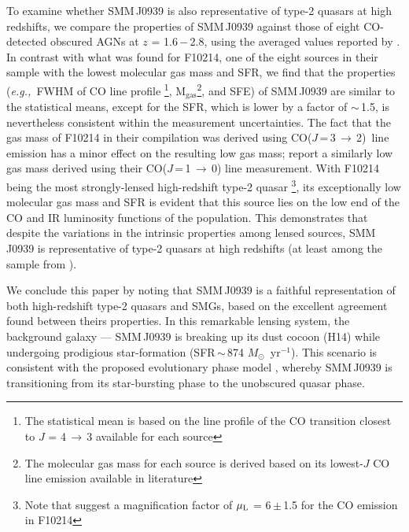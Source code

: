 \documentclass[iop]{emulateapj}
\newcommand{\Msun}{\mbox{$M_{\odot}$}}
\newcommand{\rarr}{$\rightarrow$}
\newcommand{\CO}{\mbox{CO($J$\,=\,3\,$\rightarrow$\,2) }}
\newcommand{\eg}{{\sl e.g.,~}}
\newcommand{\pmOne}{\mbox{$^{-1}$}}
\begin{document}
To examine whether SMM\,J0939 is also representative of type-2 quasars at high redshifts, we compare the properties of SMM\,J0939
against those of eight CO-detected obscured AGNs at $z$ = 1.6\,$-$\,2.8, using the averaged values reported by \citet[][and references
therein]{Polletta11a}. %
In contrast with what was found for F10214, one of the eight sources in their sample with the lowest molecular gas mass and SFR, we find that the properties
(\eg FWHM of CO line profile \footnote{The statistical mean is based on the line profile of the CO transition closest to $J$ = 4\,\rarr\,3 available for each source}, M$_\textrm{gas}$\footnote{The molecular gas mass for each source is derived based on its lowest-$J$ CO line emission available in literature}, and SFE) of SMM\,J0939 are similar to the statistical means, except for the SFR, which is lower by a
factor of $\sim$\,1.5, is nevertheless consistent within the measurement uncertainties. The fact that the gas mass of F10214 in their compilation was derived using \CO line emission \citep{Solomon05a} has a minor effect on the resulting low gas mass; \citet{Riechers11a} report a similarly low gas mass derived using their CO($J$\,=\,1\,\rarr\,0) line measurement. 
With F10214 being the most strongly-lensed high-redshift type-2 quasar \citep[$\mu_{\textrm L}$ = 17; ][]{Solomon05a}\footnote{Note that \citet{Deane13a} suggest a magnification factor of $\mu_{\textrm L}$ = 6\,$\pm$\,1.5 for the CO emission in F10214}, its exceptionally low molecular gas mass and SFR is evident that this source lies on the low end of the CO and IR luminosity functions of the population.
This demonstrates that despite the variations in the intrinsic properties among lensed sources,
 SMM\,J0939 is representative of type-2 quasars at high redshifts (at least among the sample from \citealt{Polletta11a}).

We conclude this paper by noting that SMM\,J0939 is a faithful representation of both high-redshift type-2 quasars and SMGs,
based on the excellent agreement found between theirs properties. In this remarkable lensing system, the background galaxy --- SMM\,J0939 is
breaking up its dust cocoon (H14) while undergoing prodigious star-formation (SFR\,$\sim$\,874 \Msun~yr\pmOne).
This scenario is consistent with the proposed evolutionary phase model \citep{Sanders88,Coppin08a,Simpson12a}, whereby SMM\,J0939 is transitioning from its star-bursting phase to the unobscured quasar phase.
\end{document}

